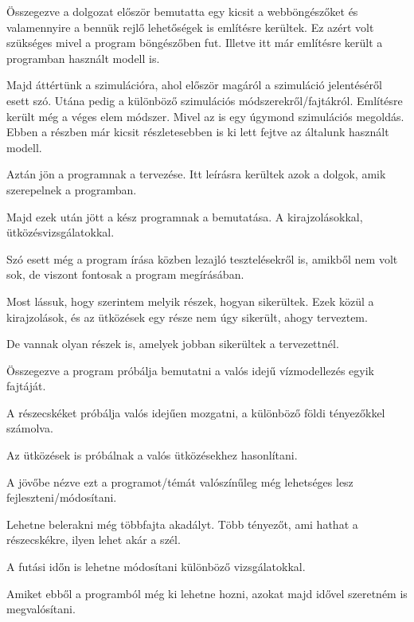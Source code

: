 


Összegezve a dolgozat először bemutatta egy kicsit a webböngészőket és valamennyire a bennük rejlő lehetőségek is említésre kerültek. Ez azért volt szükséges mivel a program böngészőben fut. Illetve itt már említésre került a programban használt modell is. 

Majd áttértünk a szimulációra, ahol először magáról a szimuláció jelentéséről esett szó. Utána pedig a különböző szimulációs módszerekről/fajtákról. Említésre került még a véges elem módszer. Mivel az is egy úgymond szimulációs megoldás. Ebben a részben már kicsit részletesebben is ki lett fejtve az általunk használt modell.

Aztán jön a programnak a tervezése. Itt leírásra kerültek azok a dolgok, amik szerepelnek a programban. 


Majd ezek után jött a kész programnak a bemutatása. A kirajzolásokkal, ütközésvizsgálatokkal. 

Szó esett még a program írása közben lezajló tesztelésekről is, amikből nem volt sok, de viszont fontosak a program megírásában. 

Most lássuk, hogy szerintem melyik részek, hogyan sikerültek. Ezek közül a kirajzolások, és az ütközések egy része nem úgy sikerült, ahogy terveztem. 

De vannak olyan részek is, amelyek jobban sikerültek a tervezettnél. 


Összegezve a program próbálja bemutatni a valós idejű vízmodellezés egyik fajtáját. 

A részecskéket próbálja valós idejűen mozgatni, a különböző földi tényezőkkel számolva. 

Az ütközések is próbálnak a valós ütközésekhez hasonlítani. 

A jövőbe nézve ezt a programot/témát valószínűleg még lehetséges lesz fejleszteni/módosítani.

Lehetne belerakni még többfajta akadályt. Több tényezőt, ami hathat a részecskékre, ilyen lehet akár a szél. 

A futási időn is lehetne módosítani különböző vizsgálatokkal. 

Amiket ebből a programból még ki lehetne hozni, azokat majd idővel szeretném is megvalósítani. 
